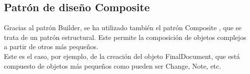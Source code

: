 \subsection{Patrón de diseño Composite}

Gracias al patrón Builder, se ha utilizado también el patrón Composite \cite{composite}, que se trata de un patrón estructural. Este permite la composición de objetos complejos a partir de otros más pequeños. 
\\

Este es el caso, por ejemplo, de la creación del objeto FinalDocument, que está compuesto de objetos más pequeños como pueden ser Change, Note, etc.